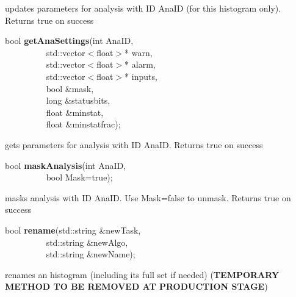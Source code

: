 updates parameters for analysis with ID AnaID (for this histogram only). Returns true on success


\item    bool {\bf getAnaSettings}(int AnaID,\\\mbox{}~~~~~~~~~
                      std::vector$<$float$>$* warn,\\\mbox{}~~~~~~~~~ 
                      std::vector$<$float$>$* alarm,\\\mbox{}~~~~~~~~~
                      std::vector$<$float$>$* inputs,\\\mbox{}~~~~~~~~~
                      bool \&mask,\\\mbox{}~~~~~~~~~
                      long \&statusbits,\\\mbox{}~~~~~~~~~
                      float \&minstat,\\\mbox{}~~~~~~~~~
                      float \&minstatfrac);

 gets parameters for analysis with ID AnaID. Returns true on success


\item    bool {\bf maskAnalysis}(int AnaID,\\\mbox{}~~~~~~~~~
                    bool Mask=true);

 masks analysis with ID AnaID. Use Mask=false to unmask. Returns true on success


\item    bool {\bf rename}(std::string \&newTask,\\\mbox{}~~~~~~~~~
              std::string \&newAlgo,\\\mbox{}~~~~~~~~~
              std::string \&newName);

 renames an histogram (including its full set if needed) 
 ({\bf TEMPORARY METHOD TO BE REMOVED AT PRODUCTION STAGE})


